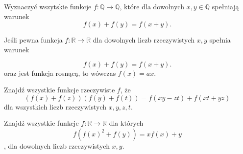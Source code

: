 



\noindent
Wyznaczyć wszytskie funkcje $f:\mathbb{Q}\longrightarrow\mathbb{Q}$, które dla dowolnych $x, y \in \mathbb{Q}$ spełniają warunek
\[
	f(x) + f(y) = f(x + y).
\]






\noindent
Jeśli pewna funkcja $f:\mathbb{R}\longrightarrow\mathbb{R}$ dla dowolnych liczb rzeczywistych $x, y$ spełnia warunek

\[
	f(x) + f(y) = f(x + y).
\]
oraz jest funkcja rosnącą, to wówczas $f(x) = ax$.




\noindent
Znajdź wszystkie funkcje rzeczywiste $f$, że 
\[ 
	\left(f(x)+f(z)\right)\left(f(y)+f(t)\right)=f(xy-zt)+f(xt+yz)  
\] 
dla wszystkich liczb rzeczywistych $x,y,z,t$.






\noindent
Znajdź wszystkie funkcje $ f:\mathbb{R}\to\mathbb{R} $ dla których 
\[
	f(f(x)^2+f(y)) = xf(x)+y 
\],
dla dowolnych liczb rzeczywistych $x, y$.

